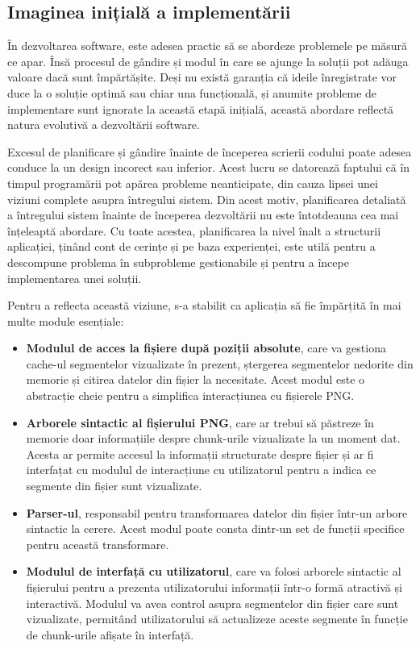 \documentclass[a4paper,12pt]{report}
\begin{document}
\subsection{Imaginea inițială a implementării}

În dezvoltarea software, este adesea practic să se abordeze problemele pe măsură ce apar.
Însă procesul de gândire și modul în care se ajunge la soluții
pot adăuga valoare dacă sunt împărtășite.
Deși nu există garanția că ideile înregistrate vor duce
la o soluție optimă sau chiar una funcțională,
și anumite probleme de implementare sunt ignorate la această etapă inițială,
această abordare reflectă natura evolutivă a dezvoltării software.

Excesul de planificare și gândire înainte de începerea scrierii codului
poate adesea conduce la un design incorect sau inferior.
Acest lucru se datorează faptului că în timpul programării pot apărea probleme neanticipate,
din cauza lipsei unei viziuni complete asupra întregului sistem.
Din acest motiv, planificarea detaliată a întregului sistem înainte de începerea dezvoltării
nu este întotdeauna cea mai înțeleaptă abordare.
Cu toate acestea, planificarea la nivel înalt a structurii aplicației,
ținând cont de cerințe și pe baza experienței,
este utilă pentru a descompune problema în subprobleme gestionabile
și pentru a începe implementarea unei soluții.

Pentru a reflecta această viziune, s-a stabilit ca aplicația
să fie împărțită în mai multe module esențiale:
\begin{itemize}
  \item 
  \textbf{Modulul de acces la fișiere după poziții absolute},
  care va gestiona cache-ul segmentelor vizualizate în prezent,
  ștergerea segmentelor nedorite din memorie și citirea datelor din fișier la necesitate.
  Acest modul este o abstracție cheie pentru a simplifica interacțiunea cu fișierele \ac{PNG}.

  \item
  \textbf{Arborele sintactic al fișierului \ac{PNG}},
  care ar trebui să păstreze în memorie doar informațiile despre
  chunk-urile vizualizate la un moment dat.
  Acesta ar permite accesul la informații structurate despre fișier
  și ar fi interfațat cu modulul de interacțiune cu utilizatorul
  pentru a indica ce segmente din fișier sunt vizualizate.

  \item
  \textbf{Parser-ul}, responsabil pentru transformarea datelor
  din fișier într-un arbore sintactic la cerere.
  Acest modul poate consta dintr-un set de funcții specifice pentru această transformare.

  \item
  \textbf{Modulul de interfață cu utilizatorul},
  care va folosi arborele sintactic al fișierului pentru
  a prezenta utilizatorului informații într-o formă atractivă și interactivă.
  Modulul va avea control asupra segmentelor din fișier care sunt vizualizate,
  permitând utilizatorului să actualizeze aceste segmente
  în funcție de chunk-urile afișate în interfață.
\end{itemize}
\end{document}
